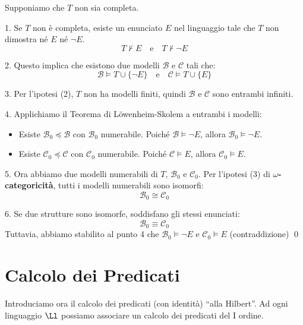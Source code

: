 \documentclass[a4paper,11pt]{report}
\begin{document}
\begin{proofframe}{}{}
Supponiamo che \(T\) non sia completa.

1.  Se \(T\) non è completa, esiste un enunciato \(E\) nel linguaggio tale che \(T\) non dimostra né \(E\) né \(\neg E\).    
\[
    T \not\vdash E \quad \text{e} \quad T \not\vdash \neg E
    \]
    
2.  Questo implica che esistono due modelli \(\mathcal{B}\) e \(\mathcal{C}\) tali che:
    \[
    \mathcal{B} \models T \cup \{\neg E\} \quad \text{e} \quad \mathcal{C} \models T \cup \{E\}
    \]
    
3.  Per l'ipotesi (2), \(T\) non ha modelli finiti, quindi \(\mathcal{B}\) e \(\mathcal{C}\) sono entrambi infiniti.

4.  Applichiamo il Teorema di Löwenheim-Skolem a entrambi i modelli:
    \begin{itemize}
        \item Esiste \(\mathcal{B}_0 \preceq \mathcal{B}\) con \(\mathcal{B}_0\) numerabile. Poiché \(\mathcal{B} \models \neg E\), allora \(\mathcal{B}_0 \models \neg E\).
        \item Esiste \(\mathcal{C}_0 \preceq \mathcal{C}\) con \(\mathcal{C}_0\) numerabile. Poiché \(\mathcal{C} \models E\), allora \(\mathcal{C}_0 \models E\).
    \end{itemize}

5.  Ora abbiamo due modelli numerabili di \(T\), \(\mathcal{B}_0\) e \(\mathcal{C}_0\).
    Per l'ipotesi (3) di \textbf{\(\omega\)-categoricità}, tutti i modelli numerabili sono isomorfi:
    \[
    \mathcal{B}_0 \cong \mathcal{C}_0
    \]

6.  Se due strutture sono isomorfe, soddisfano gli stessi enunciati:
    \[
    \mathcal{B}_0 \equiv \mathcal{C}_0
    \]
    Tuttavia, abbiamo stabilito al punto 4 che \(\mathcal{B}_0 \models \neg E\) e \(\mathcal{C}_0 \models E\) (contraddizione) \qed
\end{proofframe}

\chapter{Calcolo dei Predicati}
Introduciamo ora il calcolo dei predicati (con identità) ``alla Hilbert''. Ad ogni linguaggio \( \Ll \) possiamo associare un calcolo dei predicati del I ordine.
\end{document}
